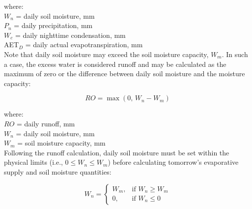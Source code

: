 \noindent where: \\
\indent $W_n$ = daily soil moisture, mm\\
\indent $P_n$ = daily precipitation, mm\\
\indent $W_c$ = daily nighttime condensation, mm\\
\indent AET$_D$ = daily actual evapotranspiration, mm\\

\noindent Note that daily soil moisture may exceed the soil moisture capacity, $W_m$. 
In such a case, the excess water is considered runoff and may be calculated as the maximum of zero or the difference between daily soil moisture and the moisture capacity:

\begin{equation}
\label{eq:ro}
	RO = \max\left(0\text{, }W_n-W_m\right)
\end{equation}

\noindent where: \\
\indent $RO$ = daily runoff, mm\\
\indent $W_n$ = daily soil moisture, mm\\
\indent $W_m$ = soil moisture capacity, mm\\

\noindent Following the runoff calculation, daily soil moisture must be set within the physical limits (i.e., $0\leq W_n\leq W_m$) before calculating tomorrow's evaporative supply and soil moisture quantities:

\begin{equation}
\label{eq:wn}
	W_n = 
	\begin{cases}
		W_m, & \text{if } W_n \geq W_m\\
		0, & \text{if } W_n \leq 0
	\end{cases}
\end{equation}


